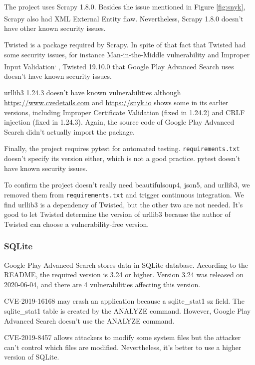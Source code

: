 \documentclass[12pt, a4paper]{article}
\newcommand{\code}[1]{\texttt{#1}}
\begin{document}
The project uses Scrapy 1.8.0. Besides the issue mentioned in Figure \ref{fig:snyk}, Scrapy also had XML External Entity flaw.\textsuperscript{\cite{scrapy-xml}} Nevertheless, Scrapy 1.8.0 doesn't have other known security issues.

Twisted is a package required by Scrapy. In spite of that fact that Twisted had some security issues, for instance Man-in-the-Middle vulnerability and Improper Input Validation\textsuperscript{\cite{cve-twisted}, \cite{snyk-twisted}}, Twisted 19.10.0 that Google Play Advanced Search uses doesn't have known security issues.

urllib3 1.24.3 doesn't have known vulnerabilities although \url{https://www.cvedetails.com} and \url{https://snyk.io} shows some in its earlier versions, including Improper Certificate Validation (fixed in 1.24.2) and CRLF injection (fixed in 1.24.3). Again, the source code of Google Play Advanced Search didn't actually import the package.

Finally, the project requires pytest for automated testing. \code{requirements.\linebreak[0]txt} doesn't specify its version either, which is not a good practice. pytest doesn't have known security issues.


To confirm the project doesn't really need beautifulsoup4, json5, and urllib3, we removed them from \code{requirements.\linebreak[0]txt} and trigger continuous integration. We find urllib3 is a dependency of Twisted, but the other two are not needed. It's good to let Twisted determine the version of urllib3 because the author of Twisted can choose a vulnerability-free version.

\subsubsection{SQLite}
Google Play Advanced Search stores data in SQLite database. According to the README, the required version is 3.24 or higher. Version 3.24 was released on 2020-06-04, and there are 4 vulnerabilities affecting this version.

CVE-2019-16168 may crash an application because a sqlite\_stat1 sz field. The sqlite\_stat1 table is created by the ANALYZE command. However, Google Play Advanced Search doesn't use the ANALYZE command.

CVE-2019-8457 allows attackers to modify some system files but the attacker can't control which files are modified. Nevertheless, it's better to use a higher version of SQLite.
\end{document}
